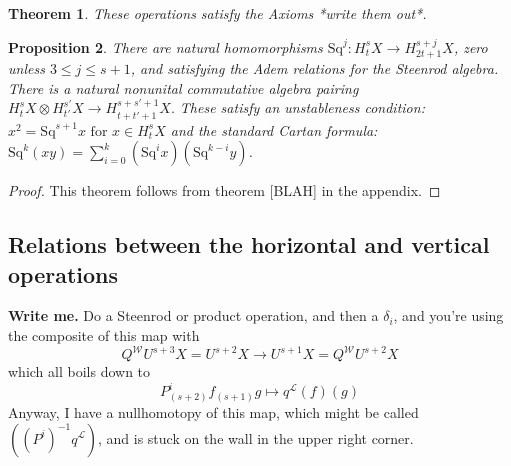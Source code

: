 \documentclass[11pt]{amsart}
\theoremstyle{plain}
\newtheorem{thm}{Theorem}[section]
\newtheorem{prop}[thm]{Proposition}
\theoremstyle{definition}
\renewcommand{\to}{\longrightarrow}
\newcommand{\calW}{\mathcal{W}}
\newcommand{\calL}{\mathcal{L}}
\theoremstyle{plain}
\newcommand{\Sq}{\mathrm{Sq}}
\begin{document}
\begin{Cohomology operations for all unstable Lie algebras}
\begin{thm}
These operations satisfy the Axioms *write them out*.
\end{thm}
\begin{prop}\tiny
There are natural homomorphisms
$\Sq^j:H_t^{s}X\to H_{2t+1}^{s+j}X$,
zero unless $3\leq j\leq s+1$, and satisfying the Adem relations for the Steenrod algebra. There is a natural nonunital commutative algebra pairing
$H_t^{s}X\otimes H_{t'}^{s'}X\to H_{t+t'+1}^{s+s'+1}X.$
These satisfy an unstableness condition:
$x^2=\Sq^{s+1}x\text{ for }x\in H^{s}_tX$
and the standard Cartan formula:
$\Sq^k(xy)=\sum_{i=0}^k(\Sq^ix)(\Sq^{k-i}y)$.
\end{prop}
\begin{proof}
This theorem follows from theorem [BLAH] in the appendix.
\end{proof}
\subsection{Relations between the horizontal and vertical operations}
\textbf{Write me.} Do a Steenrod or product operation, and then a $\delta_i$, and you're using the composite of this map with
\[Q^\calW U^{s+3}X=U^{s+2}X\to U^{s+1}X=Q^\calW U^{s+2}X\]
which all boils down to
\[P^i_{(s+2)}f_{(s+1)}g\mapsto q^{\calL}(f)(g)\]
Anyway, I have a nullhomotopy of this map, which might be called $((P^i)^{-1}q^{\calL})$, and is stuck on the wall in the upper right corner.



\end{Cohomology operations for all unstable Lie algebras}
\end{document}
